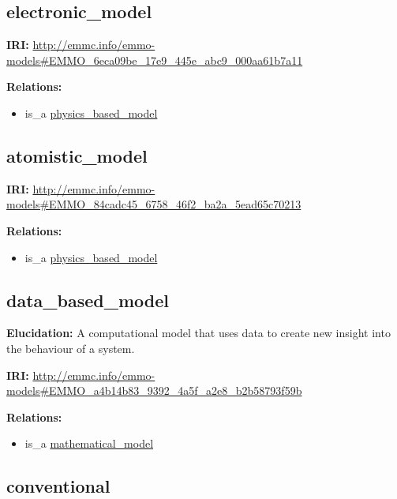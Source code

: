 \documentclass[a4paper,]{report}
\providecommand{\tightlist}{%
  \setlength{\itemsep}{0pt}\setlength{\parskip}{0pt}}
\begin{document}
\hypertarget{electronic_model}{%
\subsection{electronic\_model}\label{electronic_model}}

\textbf{IRI:}
\url{http://emmc.info/emmo-models\#EMMO_6eca09be_17e9_445e_abc9_000aa61b7a11}

\textbf{Relations:}

\begin{itemize}
\tightlist
\item
  is\_a \protect\hyperlink{physics_based_model}{physics\_based\_model}
\end{itemize}

\hypertarget{atomistic_model}{%
\subsection{atomistic\_model}\label{atomistic_model}}

\textbf{IRI:}
\url{http://emmc.info/emmo-models\#EMMO_84cadc45_6758_46f2_ba2a_5ead65c70213}

\textbf{Relations:}

\begin{itemize}
\tightlist
\item
  is\_a \protect\hyperlink{physics_based_model}{physics\_based\_model}
\end{itemize}

\hypertarget{data_based_model}{%
\subsection{data\_based\_model}\label{data_based_model}}

\textbf{Elucidation:} A computational model that uses data to create new
insight into the behaviour of a system.

\textbf{IRI:}
\url{http://emmc.info/emmo-models\#EMMO_a4b14b83_9392_4a5f_a2e8_b2b58793f59b}

\textbf{Relations:}

\begin{itemize}
\tightlist
\item
  is\_a \protect\hyperlink{mathematical_model}{mathematical\_model}
\end{itemize}

\hypertarget{conventional}{%
\subsection{conventional}\label{conventional}}
\end{document}
